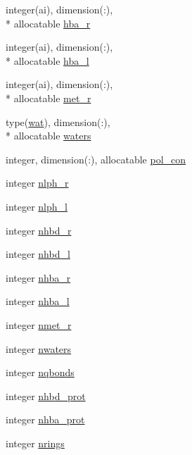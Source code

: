 \begin{DoxyCompactItemize}
integer(ai), dimension(\-:), \\*
allocatable \hyperlink{classcalc__chemscore_a2d5806a7dbd81e921bd36250e2c5e625}{hba\-\_\-r}
\item 
integer(ai), dimension(\-:), \\*
allocatable \hyperlink{classcalc__chemscore_acd1541a9ea18346f52dd8b3d8690928b}{hba\-\_\-l}
\item 
integer(ai), dimension(\-:), \\*
allocatable \hyperlink{classcalc__chemscore_a8d928ea8b4d7dd3d55c900989dd2349a}{met\-\_\-r}
\item 
type(\hyperlink{structcalc__chemscore_1_1wat}{wat}), dimension(\-:), \\*
allocatable \hyperlink{classcalc__chemscore_ab81e8c2249c6c29046df0cf2d5dc9cac}{waters}
\item 
integer, dimension(\-:), allocatable \hyperlink{classcalc__chemscore_a967fddb2385d770370d95b0d762617a6}{pol\-\_\-con}
\item 
integer \hyperlink{classcalc__chemscore_a398cedd02c40d7f982a22ccc167e29f0}{nlph\-\_\-r}
\item 
integer \hyperlink{classcalc__chemscore_a4eec2bd11c50bf788ae8928ba575fbef}{nlph\-\_\-l}
\item 
integer \hyperlink{classcalc__chemscore_a5bffc5652f8ffe498565f481d234250d}{nhbd\-\_\-r}
\item 
integer \hyperlink{classcalc__chemscore_a77e25979c44ad62df2302682ed5ce099}{nhbd\-\_\-l}
\item 
integer \hyperlink{classcalc__chemscore_a3ee7fc10e0807111d9574989ecc56269}{nhba\-\_\-r}
\item 
integer \hyperlink{classcalc__chemscore_a1b8de903d8b742309e2a5fda2f90fe2e}{nhba\-\_\-l}
\item 
integer \hyperlink{classcalc__chemscore_abc3a16c3de721ae16d616b77d7cceec2}{nmet\-\_\-r}
\item 
integer \hyperlink{classcalc__chemscore_a9620ce63e8c0a9af29f2e28281526f61}{nwaters}
\item 
integer \hyperlink{classcalc__chemscore_a95d0411713ed1669162b176b8fd96065}{nqbonds}
\item 
integer \hyperlink{classcalc__chemscore_a03c8c74285e823b77a4b9342b74063ef}{nhbd\-\_\-prot}
\item 
integer \hyperlink{classcalc__chemscore_afbfb586ffade33d234a7bce3ec4899e4}{nhba\-\_\-prot}
\item 
integer \hyperlink{classcalc__chemscore_a86fcc5a701ba3b1900908778c29fccc1}{nrings}

\end{DoxyCompactItemize}
